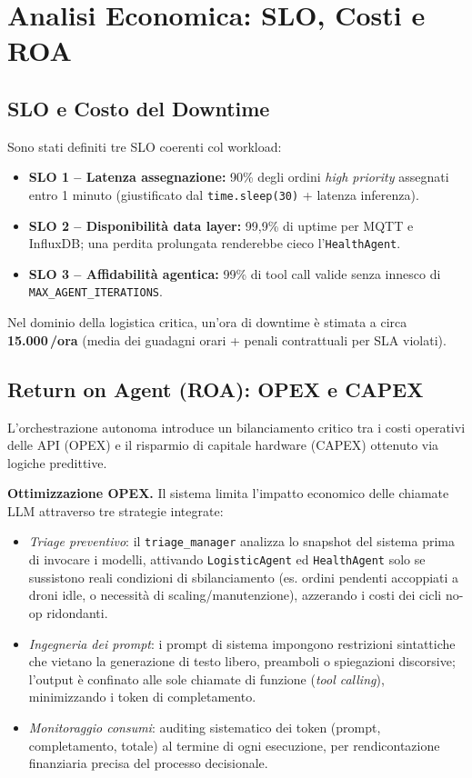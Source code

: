 
\chapter{Analisi Economica: SLO, Costi e ROA}
\label{cap:analisi_economica}

\section{SLO e Costo del Downtime}
\label{sec:slo_downtime}

Sono stati definiti tre SLO coerenti col workload:
\begin{itemize}
    \item \textbf{SLO 1 -- Latenza assegnazione:} 90\% degli ordini \textit{high priority} assegnati entro 1 minuto (giustificato dal \texttt{time.sleep(30)} + latenza inferenza).
    \item \textbf{SLO 2 -- Disponibilità data layer:} 99{,}9\% di uptime per MQTT e InfluxDB; una perdita prolungata renderebbe cieco l'\texttt{HealthAgent}.
    \item \textbf{SLO 3 -- Affidabilità agentica:} 99\% di tool call valide senza innesco di \texttt{MAX\_AGENT\_ITERATIONS}.
\end{itemize}

Nel dominio della logistica critica, un'ora di downtime è stimata a circa \textbf{15.000\,\texteuro/ora} (media dei guadagni orari + penali contrattuali per SLA violati).

\section{Return on Agent (ROA): OPEX e CAPEX}
\label{sec:roa}

L'orchestrazione autonoma introduce un bilanciamento critico tra i costi operativi delle API (OPEX) e il risparmio di capitale hardware (CAPEX) ottenuto via logiche predittive.

\textbf{Ottimizzazione OPEX.} Il sistema limita l'impatto economico delle chiamate LLM attraverso tre strategie integrate:
\begin{itemize}
    \item \textit{Triage preventivo}: il \texttt{triage\_manager} analizza lo snapshot del sistema prima di invocare i modelli, attivando \texttt{LogisticAgent} ed \texttt{HealthAgent} solo se sussistono reali condizioni di sbilanciamento (es. ordini pendenti accoppiati a droni idle, o necessità di scaling/manutenzione), azzerando i costi dei cicli no-op ridondanti.
    \item \textit{Ingegneria dei prompt}: i prompt di sistema impongono restrizioni sintattiche che vietano la generazione di testo libero, preamboli o spiegazioni discorsive; l'output è confinato alle sole chiamate di funzione (\textit{tool calling}), minimizzando i token di completamento.
    \item \textit{Monitoraggio consumi}: auditing sistematico dei token (prompt, completamento, totale) al termine di ogni esecuzione, per rendicontazione finanziaria precisa del processo decisionale.
\end{itemize}


